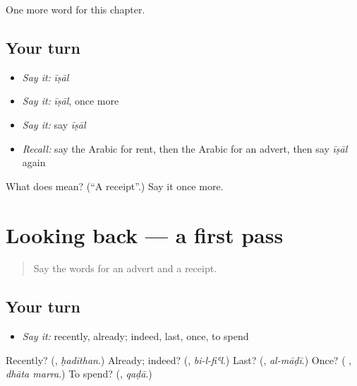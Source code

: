 \begin{grammarlens}[title={What you've built}]
One more word for this chapter.
\end{grammarlens}

\subsection*{Your turn}
\begin{itemize}
\raggedright
  \item \emph{Say it:} \emph{īṣāl}
  \item \emph{Say it:} \emph{īṣāl}, once more
  \item \emph{Say it:} say \emph{īṣāl}
  \item \emph{Recall:} say the Arabic for rent, then the Arabic for an advert, then say \emph{īṣāl} again
\end{itemize}

\begin{tcolorbox}[breakable,colback=teal!4,colframe=teal!35!black,title={Before you move on}]
What does  mean? (\textquotedblleft{}A receipt\textquotedblright{}.) Say it once more.
\end{tcolorbox}
\section[(dialogue)]{Looking back — a first pass}

\label{lesson:AR-R158-first-pass-looking-back}



\begin{quote}
Say the words for an advert and a receipt.
\end{quote}

\subsection*{Your turn}
\begin{itemize}
\raggedright
  \item \emph{Say it:} recently, already; indeed, last, once, to spend
\end{itemize}

\begin{tcolorbox}[breakable,colback=teal!4,colframe=teal!35!black,title={Before you move on}]
Recently? (\textbf{}, \emph{ḥadīthan}.) Already; indeed? (\textbf{}, \emph{bi-l-fiʿl}.) Last? (\textbf{}, \emph{al-māḍī}.) Once? (\textbf{ }, \emph{dhāta marra}.) To spend? (\textbf{}, \emph{qaḍā}.)
\end{tcolorbox}
